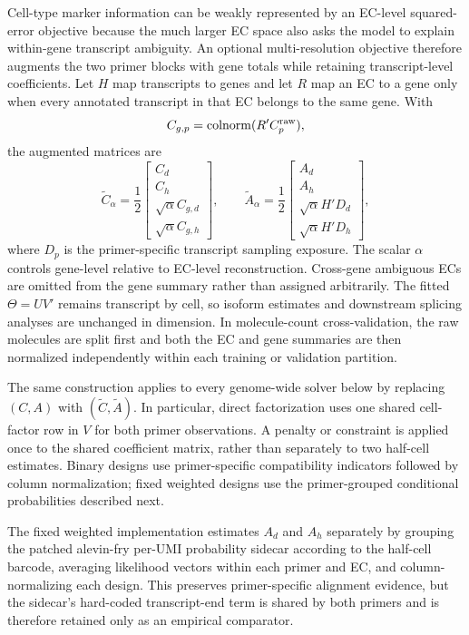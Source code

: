 \documentclass[11pt]{article}
\begin{document}
Cell-type marker information can be weakly represented by an EC-level
squared-error objective because the much larger EC space also asks the model
to explain within-gene transcript ambiguity. An optional multi-resolution
objective therefore augments the two primer blocks with gene totals while
retaining transcript-level coefficients. Let \(H\) map transcripts to genes
and let \(R\) map an EC to a gene only when every annotated transcript in that
EC belongs to the same gene. With
\[
  C_{g,p}=\operatorname{colnorm}(R'C^{\rm raw}_p),
\]
the augmented matrices are
\[
  \widetilde C_\alpha=\frac{1}{2}
  \begin{bmatrix}C_d\\C_h\\\sqrt{\alpha}C_{g,d}\\
                  \sqrt{\alpha}C_{g,h}\end{bmatrix},
  \qquad
  \widetilde A_\alpha=\frac{1}{2}
  \begin{bmatrix}A_d\\A_h\\\sqrt{\alpha}H'D_d\\
                  \sqrt{\alpha}H'D_h\end{bmatrix},
\]
where \(D_p\) is the primer-specific transcript sampling exposure.
The scalar \(\alpha\) controls gene-level relative to EC-level reconstruction.
Cross-gene ambiguous ECs are omitted from the gene summary rather than
assigned arbitrarily. The fitted \(\Theta=UV'\) remains transcript by cell,
so isoform estimates and downstream splicing analyses are unchanged in
dimension. In molecule-count cross-validation, the raw molecules are split
first and both the EC and gene summaries are then normalized independently
within each training or validation partition.

The same construction applies to every genome-wide solver below by replacing
\((C,A)\) with \((\widetilde C,\widetilde A)\). In particular, direct
factorization uses one shared cell-factor row in \(V\) for both primer
observations. A penalty or constraint is applied once to the shared
coefficient matrix, rather than separately to two half-cell estimates. Binary
designs use primer-specific compatibility indicators followed by column
normalization; fixed weighted designs use the primer-grouped conditional
probabilities described next.

The fixed weighted implementation estimates \(A_d\) and \(A_h\) separately by
grouping the patched alevin-fry per-UMI probability sidecar according to the
half-cell barcode, averaging likelihood vectors within each primer and EC,
and column-normalizing each design. This preserves primer-specific alignment
evidence, but the sidecar's hard-coded transcript-end term is shared by both
primers and is therefore retained only as an empirical comparator.
\end{document}

